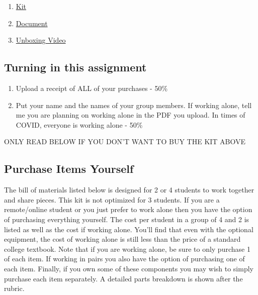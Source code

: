 \begin{enumerate}[itemsep=-5pt]
  \item \href{https://www.tangiblesthatteach.com/product-page/instrumentation-kit-for-me-316}{Kit}
  \item \href{https://a2279211-28c1-4f46-9477-0d3265900c7f.filesusr.com/ugd/2413aa_ca39175b0a514b838ec96893b90590eb.pdf}{Document}
  \item \href{https://youtu.be/6sNNQrhnzLE}{Unboxing Video}
\end{enumerate}

\subsection{Turning in this assignment}

\begin{enumerate}[itemsep=-5pt]
  \item Upload a receipt of ALL of your purchases - 50\%
  \item Put your name and the names of your group members. If working
    alone, tell me you are planning on working alone in the PDF you
    upload. In times of COVID, everyone is working alone - 50\%
\end{enumerate}

\newpage

\begin{center}\LARGE{ONLY READ BELOW IF YOU DON’T WANT TO BUY THE KIT
    ABOVE}\end{center}

\subsection{Purchase Items Yourself}

The bill of materials listed below is designed for 2 or 4 students to work together and share
pieces. This kit is not optimized for 3 students. If you are a remote/online student or you just
prefer to work alone then you have the option of purchasing everything yourself. The cost per
student in a group of 4 and 2 is listed as well as the cost if working alone. You’ll find that even
with the optional equipment, the cost of working alone is still less than the price of a standard
college textbook. Note that if you are working alone, be sure to only purchase 1 of each item. If
working in pairs you also have the option of purchasing one of each item. Finally, if you own
some of these components you may wish to simply purchase each item separately. A detailed
parts breakdown is shown after the rubric.

